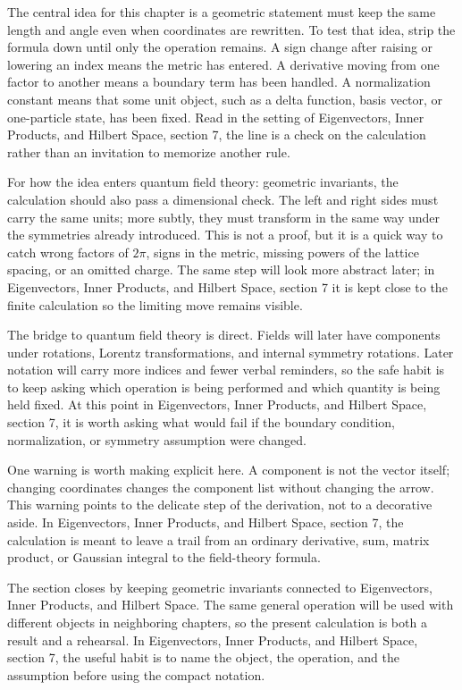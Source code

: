 The central idea for this chapter is a geometric statement must keep the same length and angle even when coordinates are rewritten.  To test that idea, strip the formula down until only the operation remains.  A sign change after raising or lowering an index means the metric has entered.  A derivative moving from one factor to another means a boundary term has been handled.  A normalization constant means that some unit object, such as a delta function, basis vector, or one-particle state, has been fixed.  Read in the setting of Eigenvectors, Inner Products, and Hilbert Space, section 7, the line is a check on the calculation rather than an invitation to memorize another rule.

For how the idea enters quantum field theory: geometric invariants, the calculation should also pass a dimensional check.  The left and right sides must carry the same units; more subtly, they must transform in the same way under the symmetries already introduced.  This is not a proof, but it is a quick way to catch wrong factors of \(2\pi\), signs in the metric, missing powers of the lattice spacing, or an omitted charge.  The same step will look more abstract later; in Eigenvectors, Inner Products, and Hilbert Space, section 7 it is kept close to the finite calculation so the limiting move remains visible.

The bridge to quantum field theory is direct.  Fields will later have components under rotations, Lorentz transformations, and internal symmetry rotations.  Later notation will carry more indices and fewer verbal reminders, so the safe habit is to keep asking which operation is being performed and which quantity is being held fixed.  At this point in Eigenvectors, Inner Products, and Hilbert Space, section 7, it is worth asking what would fail if the boundary condition, normalization, or symmetry assumption were changed.

One warning is worth making explicit here.  A component is not the vector itself; changing coordinates changes the component list without changing the arrow.  This warning points to the delicate step of the derivation, not to a decorative aside.  In Eigenvectors, Inner Products, and Hilbert Space, section 7, the calculation is meant to leave a trail from an ordinary derivative, sum, matrix product, or Gaussian integral to the field-theory formula.

The section closes by keeping geometric invariants connected to Eigenvectors, Inner Products, and Hilbert Space.  The same general operation will be used with different objects in neighboring chapters, so the present calculation is both a result and a rehearsal.  In Eigenvectors, Inner Products, and Hilbert Space, section 7, the useful habit is to name the object, the operation, and the assumption before using the compact notation.




